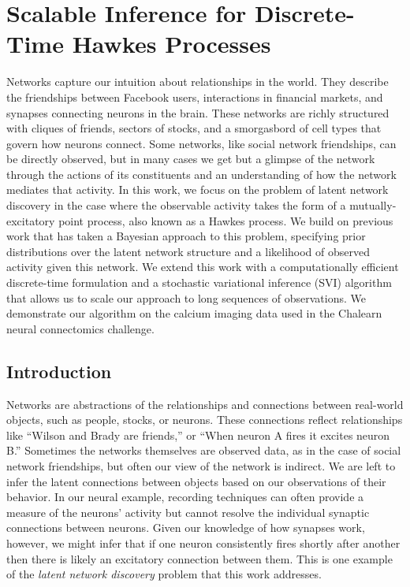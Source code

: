\chapter{Scalable Inference for Discrete-Time Hawkes Processes}
 
Networks capture our intuition about relationships in the world. 
They describe the friendships between Facebook users, interactions in financial markets, and synapses connecting neurons in the brain.
These networks are richly structured with cliques of friends, sectors of stocks, and a smorgasbord of cell types that govern how neurons connect.
Some networks, like social network friendships, can be directly observed, but in many cases we get but a glimpse of the network through the actions of its constituents and an understanding of how the network mediates that activity.  
In this work, we focus on the problem of latent network discovery in the case where the observable activity takes the form of a mutually-excitatory point process, also known as a Hawkes process.
We build on previous work that has taken a Bayesian approach to this problem, specifying prior distributions over the latent network structure and a likelihood of observed activity given this network.
We extend this work with a computationally efficient discrete-time formulation and a stochastic variational inference (SVI) algorithm that allows us to scale our approach to long sequences of observations.
We demonstrate our algorithm on the calcium imaging data used in the Chalearn neural connectomics challenge.

\section{Introduction}

Networks are abstractions of the relationships and connections between real-world objects, such as people, stocks, or neurons.
These connections reflect relationships like ``Wilson and Brady are friends,'' or ``When neuron A fires it excites neuron B.'' 
Sometimes the networks themselves are observed data, as in the case of social network friendships, but often our view of the network is indirect.
We are left to infer the latent connections between objects based on our observations of their behavior.
In our neural example, recording techniques can often provide a measure of the neurons' activity but cannot resolve the individual synaptic connections between neurons.
Given our knowledge of how synapses work, however, we might infer that if one neuron consistently fires shortly after another then there is likely an excitatory connection between them.
This is one example of  the \emph{latent network discovery} problem that this work addresses.

